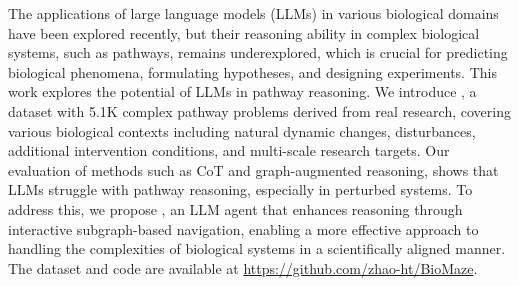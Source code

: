 



The applications of large language models (LLMs) in various biological domains have been explored recently, but their reasoning ability in complex biological systems, such as pathways, remains underexplored, which is crucial for predicting biological phenomena, formulating hypotheses, and designing experiments. This work explores the potential of LLMs in pathway reasoning. We introduce \benchname, a dataset with 5.1K complex pathway problems derived from real research, covering various biological contexts including natural dynamic changes, disturbances, additional intervention conditions, and multi-scale research targets. Our evaluation of methods such as CoT and graph-augmented reasoning, shows that LLMs struggle with pathway reasoning, especially in perturbed systems. To address this, we propose \modelname, an LLM agent that enhances reasoning through interactive subgraph-based navigation, enabling a more effective approach to handling the complexities of biological systems in a scientifically aligned manner. The dataset and code are available at \url{https://github.com/zhao-ht/BioMaze}.


